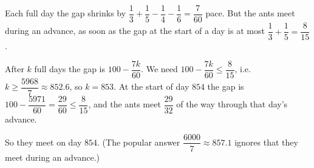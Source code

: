 Each full day the gap shrinks by $\dfrac13+\dfrac15-\dfrac14-\dfrac16=\dfrac7{60}$ pace. But the ants meet during an advance, as soon as the gap at the start of a day is at most $\dfrac13+\dfrac15=\dfrac8{15}$.

After $k$ full days the gap is $100-\dfrac{7k}{60}$. We need $100-\dfrac{7k}{60}\le\dfrac8{15}$, i.e. $k\ge\dfrac{5968}{7}\approx852.6$, so $k=853$. At the start of day $854$ the gap is $100-\dfrac{5971}{60}=\dfrac{29}{60}\le\dfrac8{15}$, and the ants meet $\dfrac{29}{32}$ of the way through that day's advance.

So they meet on day $\boxed{854}$. (The popular answer $\dfrac{6000}7\approx857.1$ ignores that they meet during an advance.)
